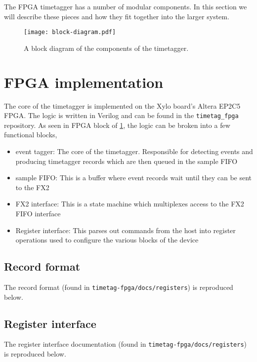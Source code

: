 The FPGA timetagger has a number of modular components. In this
section we will describe these pieces and how they fit together into
the larger system.

\begin{figure}
  \center
  \texttt{[image: block-diagram.pdf]}
  \caption{A block diagram of the components of the timetagger.}
  \label{Fig:BlockDiagram}
\end{figure}

\section{FPGA implementation}
The core of the timetagger is implemented on the Xylo board's Altera
EP2C5 FPGA. The logic is written in Verilog and can be found in the
{\tt timetag\_fpga} repository. As seen in FPGA block of
\ref{Fig:BlockDiagram}, the logic can be broken into a few functional
blocks,

\begin{itemize}
  \item event tagger: The core of the timetagger. Responsible for
    detecting events and producing timetagger records which are then
    queued in the sample FIFO
  \item sample FIFO: This is a buffer where event records wait until
    they can be sent to the FX2
  \item FX2 interface: This is a state machine which multiplexes
    access to the FX2 FIFO interface
  \item Register interface: This parses out commands from the host
    into register operations used to configure the various blocks of
    the device
\end{itemize}

\subsection{Record format}
The record format (found in {\tt timetag-fpga/docs/registers}) is reproduced below.



\subsection{Register interface}
The register interface documentation (found in
{\tt timetag-fpga/docs/registers}) is reproduced below.



